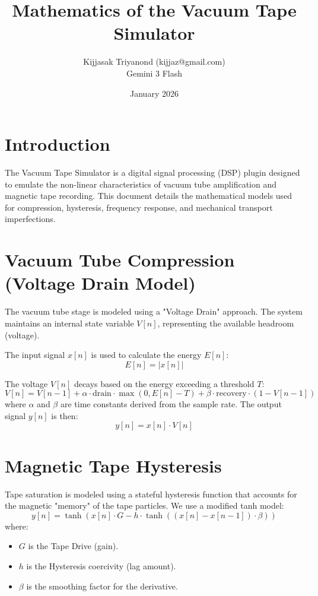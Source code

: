 \documentclass[11pt,a4paper]{article}
\title{Mathematics of the Vacuum Tape Simulator}
\author{Kijjasak Triyanond (kijjaz@gmail.com) \\ Gemini 3 Flash}
\date{January 2026}
\begin{document}
\maketitle

\section{Introduction}
The Vacuum Tape Simulator is a digital signal processing (DSP) plugin designed to emulate the non-linear characteristics of vacuum tube amplification and magnetic tape recording. This document details the mathematical models used for compression, hysteresis, frequency response, and mechanical transport imperfections.

\section{Vacuum Tube Compression (Voltage Drain Model)}
The vacuum tube stage is modeled using a "Voltage Drain" approach. The system maintains an internal state variable $V[n]$, representing the available headroom (voltage).

The input signal $x[n]$ is used to calculate the energy $E[n]$:
\begin{equation}
E[n] = |x[n]|
\end{equation}

The voltage $V[n]$ decays based on the energy exceeding a threshold $T$:
\begin{equation}
V[n] = V[n-1] + \alpha \cdot \text{drain} \cdot \max(0, E[n] - T) + \beta \cdot \text{recovery} \cdot (1 - V[n-1])
\end{equation}
where $\alpha$ and $\beta$ are time constants derived from the sample rate. The output signal $y[n]$ is then:
\begin{equation}
y[n] = x[n] \cdot V[n]
\end{equation}

\section{Magnetic Tape Hysteresis}
Tape saturation is modeled using a stateful hysteresis function that accounts for the magnetic "memory" of the tape particles. We use a modified tanh model:
\begin{equation}
y[n] = \tanh(x[n] \cdot G - h \cdot \tanh((x[n] - x[n-1]) \cdot \beta))
\end{equation}
where:
\begin{itemize}
    \item $G$ is the Tape Drive (gain).
    \item $h$ is the Hysteresis coercivity (lag amount).
    \item $\beta$ is the smoothing factor for the derivative.
\end{itemize}
\end{document}
